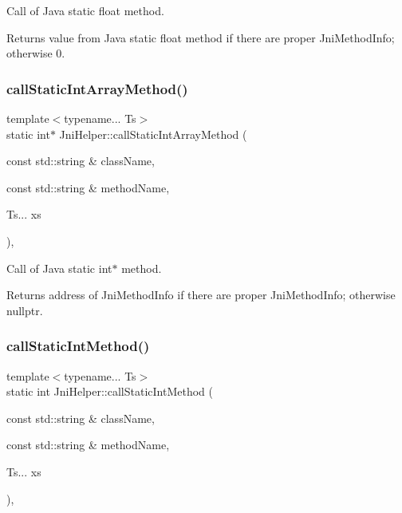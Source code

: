 Call of Java static float method. 

\begin{DoxyReturn}{Returns}
value from Java static float method if there are proper Jni\+Method\+Info; otherwise 0. 
\end{DoxyReturn}
\mbox{\label{classJniHelper_a344d60af8e2b8ff94c1f7081d216f71d}} 
\subsubsection{\texorpdfstring{call\+Static\+Int\+Array\+Method()}{callStaticIntArrayMethod()}}
{\footnotesize\ttfamily template$<$typename... Ts$>$ \\
static int$\ast$ Jni\+Helper\+::call\+Static\+Int\+Array\+Method (\begin{DoxyParamCaption}\item[{const std\+::string \&}]{class\+Name,  }\item[{const std\+::string \&}]{method\+Name,  }\item[{Ts...}]{xs }\end{DoxyParamCaption})\hspace{0.3cm}{\ttfamily [inline]}, {\ttfamily [static]}}



Call of Java static int$\ast$ method. 

\begin{DoxyReturn}{Returns}
address of Jni\+Method\+Info if there are proper Jni\+Method\+Info; otherwise nullptr. 
\end{DoxyReturn}
\mbox{\label{classJniHelper_a91319243246966249a5b5ff3b1110f5a}} 
\subsubsection{\texorpdfstring{call\+Static\+Int\+Method()}{callStaticIntMethod()}}
{\footnotesize\ttfamily template$<$typename... Ts$>$ \\
static int Jni\+Helper\+::call\+Static\+Int\+Method (\begin{DoxyParamCaption}\item[{const std\+::string \&}]{class\+Name,  }\item[{const std\+::string \&}]{method\+Name,  }\item[{Ts...}]{xs }\end{DoxyParamCaption})\hspace{0.3cm}{\ttfamily [inline]}, {\ttfamily [static]}}




